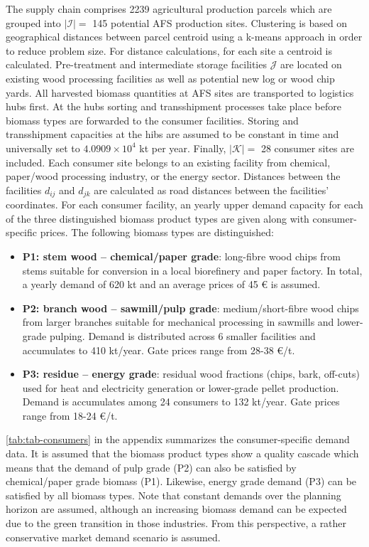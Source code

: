 \documentclass[APA,TimesLARGE]{WileyNJDv5} %
\begin{document}
The supply chain comprises 2239 agricultural production parcels which are grouped into \(|\mathcal{I}|=\) 145 potential AFS production sites. Clustering is based on geographical distances between parcel centroid using a k-means approach in order to reduce problem size. For distance calculations, for each site a centroid is calculated. Pre-treatment and intermediate storage facilities \(\mathcal{J}\) are located on existing wood processing facilities as well as potential new log or wood chip yards. All harvested biomass quantities at AFS sites are transported to logistics hubs first. At the hubs sorting and transshipment processes take place before biomass types are forwarded to the consumer facilities. Storing and transshipment capacities at the hibs are assumed to be constant in time and universally set to \ensuremath{4.0909\times 10^{4}} kt per year. Finally, \(|\mathcal{K}|=\) 28 consumer sites are included. Each consumer site belongs to an existing facility from chemical, paper/wood processing industry, or the energy sector. Distances between the facilities \(d_{ij}\) and \(d_{jk}\) are calculated as road distances between the facilities' coordinates. For each consumer facility, an yearly upper demand capacity for each of the three distinguished biomass product types are given along with consumer-specific prices. The following biomass types are distinguished:

\begin{itemize}
\item
  \textbf{P1: stem wood -- chemical/paper grade}: long-fibre wood chips from stems suitable for conversion in a local biorefinery and paper factory. In total, a yearly demand of 620 kt and an average prices of 45 \euro{} is assumed.
\item
  \textbf{P2: branch wood -- sawmill/pulp grade}: medium/short-fibre wood chips from larger branches suitable for mechanical processing in sawmills and lower-grade pulping. Demand is distributed across 6 smaller facilities and accumulates to 410 kt/year. Gate prices range from 28-38 \euro/t.
\item
  \textbf{P3: residue -- energy grade}: residual wood fractions (chips, bark, off-cuts) used for heat and electricity generation or lower-grade pellet production. Demand is accumulates among 24 consumers to 132 kt/year. Gate prices range from 18-24 \euro/t.
\end{itemize}

\autoref{tab:tab-consumers} in the appendix summarizes the consumer-specific demand data. It is assumed that the biomass product types show a quality cascade which means that the demand of pulp grade (P2) can also be satisfied by chemical/paper grade biomass (P1). Likewise, energy grade demand (P3) can be satisfied by all biomass types. Note that constant demands over the planning horizon are assumed, although an increasing biomass demand can be expected due to the green transition in those industries. From this perspective, a rather conservative market demand scenario is assumed.
\end{document}
